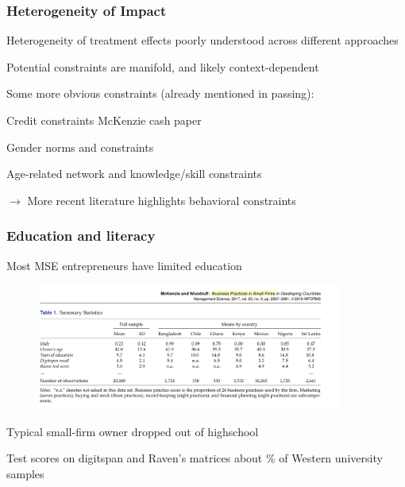 \documentclass[hideothersubsections, usenames,dvipsnames,11pt]{beamer}
\newenvironment{itemize_2pt}{\itemize\addtolength{\itemsep}{2pt}}{\enditemize}
\begin{document}
\begin{frame}
\frametitle{Heterogeneity of Impact}

Heterogeneity of treatment effects poorly understood across different approaches
\begin{itemize_2pt}
	\item Potential constraints are manifold, and likely context-dependent
	
\vspace{0.5em}	
	
	\item Some more obvious constraints (already mentioned in passing):
	\begin{itemize_2pt}
		\item \textcolor{bdf}{Credit constraints} \citep[see, e.g.,][]{} McKenzie cash paper
		\item \textcolor{bdf}{Gender norms and constraints}
		\item \textcolor{bdf}{Age-related} network and knowledge/skill \textcolor{bdf}{constraints}
	\end{itemize_2pt} 
\end{itemize_2pt}
	
	\vspace{1.0em}

$\rightarrow$ More recent literature highlights \textcolor{bdf}{behavioral constraints}

\end{frame}

\begin{frame}
\frametitle{Education and literacy}

Most MSE entrepreneurs have limited education

\vspace{-1.9em}

\begin{figure}[htbp]
	\centering
	\includegraphics[width=27em]{pics/McK2017_educ.png}
	\label{McKenzie(2017): Education and cognitive functioning}
\end{figure}

\vspace{-2.5em}

\begin{itemize_2pt}
	\item Typical small-firm owner dropped out of highschool
	\item Test scores on digitspan and Raven's matrices about \% of Western university samples \textcolor{red}{\citep[comp.][]{}}
\end{itemize_2pt}
\end{frame}
\end{document}
